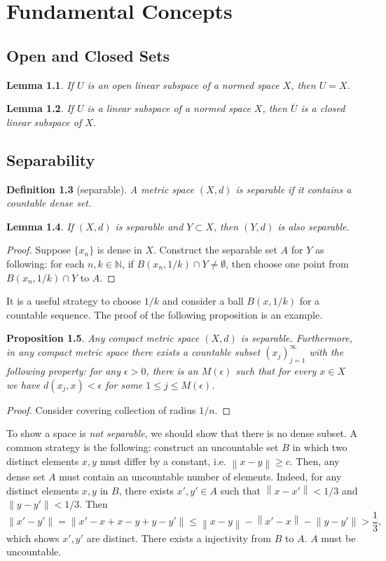 \documentclass[12pt,a4paper]{report}
\numberwithin{equation}{section}
\theoremstyle{mystyle}
\newtheorem{definition}{Definition}[section]
\newtheorem{lemma}[definition]{Lemma}
\newtheorem{proposition}[definition]{Proposition}
\newcommand{\N}{\mathbb{N}}
\newcommand{\norm}[1]{\left\lVert #1 \right\rVert}
\begin{document}
	\chapter{Fundamental Concepts}
	\section{Open and Closed Sets}
	\begin{lemma}
		If $U$ is an open linear subspace of a normed space $X$, then $U=X$.
	\end{lemma}
	
	\begin{lemma}
		If $U$ is a linear subspace of a normed space $X$, then $\overline{U}$ is a closed linear subspace of $X$.
	\end{lemma}
	
	
	
	
	\section{Separability}
	\begin{definition}[separable]
		A metric space $(X,d)$ is \emph{separable} if it contains a countable dense set.
	\end{definition}
	\begin{lemma}
		If $(X,d)$ is separable and $Y\subset X$, then $(Y,d)$ is also separable. 
	\end{lemma}
	\begin{proof}
		Suppose $\{x_n\}$ is dense in $X$. Construct the separable set $A$ for $Y$ as following: for each $n,k\in \N$, if $B(x_n,1/k)\cap Y\neq \emptyset$, then choose one point from $B(x_n,1/k)\cap Y$ to $A$.
	\end{proof}
	It is a useful strategy to choose $1/k$ and consider a ball $B(x,1/k)$ for a countable sequence. The proof of the following proposition is an example.
	\begin{proposition}
		Any compact metric space $(X,d)$ is separable. Furthermore, in any compact metric space there exists a countable subset $(x_j)_{j=1}^\infty$ with the following property: for any $\epsilon>0$, there is an $M(\epsilon)$ such that for every $x\in X$ we have $d(x_j,x)<\epsilon$ for some $1\leq j \leq M(\epsilon)$.
	\end{proposition}
	\begin{proof}
		Consider covering collection of radius $1/n$.
	\end{proof}
	
	To show a space is \emph{not separable}, we should show that there is no dense subset. A common strategy is the following: construct an uncountable set $B$ in which two distinct elements $x,y$ must differ by a constant, i.e. $\norm{x-y}\geq c$. Then, any dense set $A$ must contain an uncountable number of elements. Indeed, for any distinct elements $x,y$ in $B$, there exists $x',y'\in A$ such that $\norm{x-x'}<1/3$ and $\norm{y-y'}<1/3$. Then
	$$
	\norm{x'-y'} =\norm{x'-x+x-y+y-y'}\leq \norm{x-y}-\norm{x'-x}-\norm{y-y'}>\frac{1}{3},
	$$
	which shows $x',y'$ are distinct. There exists a injectivity from $B$ to $A$. $A$ must be uncountable.
	
\end{document}
